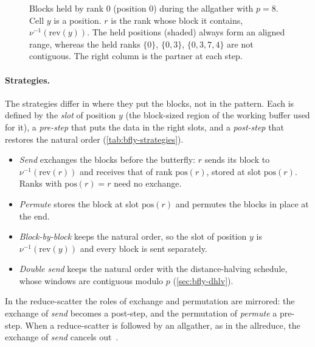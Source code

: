 \begin{figure}[t]
\centering
{}
\caption{Blocks held by rank $0$ (position $0$) during the allgather with $p=8$. Cell $y$ is a position. $r$ is the rank whose block it contains, $\nu^{-1}(\mathrm{rev}(y))$. The held positions (shaded) always form an aligned range, whereas the held ranks $\{0\}$, $\{0,3\}$, $\{0,3,7,4\}$ are not contiguous. The right column is the partner at each step.}
\label{fig:bfly-held}
\end{figure}

\paragraph{Strategies.}
The strategies differ in where they put the blocks, not in the pattern.
Each is defined by the \emph{slot} of position $y$ (the block-sized region of the working buffer used for it), a \emph{pre-step} that puts the data in the right slots, and a \emph{post-step} that restores the natural order (\cref{tab:bfly-strategies}).
\begin{itemize}
  \item \emph{Send} exchanges the blocks before the butterfly: $r$ sends its block to $\nu^{-1}(\mathrm{rev}(r))$ and receives that of rank $\mathrm{pos}(r)$, stored at slot $\mathrm{pos}(r)$.
  Ranks with $\mathrm{pos}(r)=r$ need no exchange.
  \item \emph{Permute} stores the block at slot $\mathrm{pos}(r)$ and permutes the blocks in place at the end.
  \item \emph{Block-by-block} keeps the natural order, so the slot of position $y$ is $\nu^{-1}(\mathrm{rev}(y))$ and every block is sent separately.
  \item \emph{Double send} keeps the natural order with the distance-halving schedule, whose windows are contiguous modulo $p$ (\cref{sec:bfly-dhlv}).
\end{itemize}
In the reduce-scatter the roles of exchange and permutation are mirrored: the exchange of \emph{send} becomes a post-step, and the permutation of \emph{permute} a pre-step.
When a reduce-scatter is followed by an allgather, as in the allreduce, the exchange of \emph{send} cancels out~\cite{desensi2025bine}.

